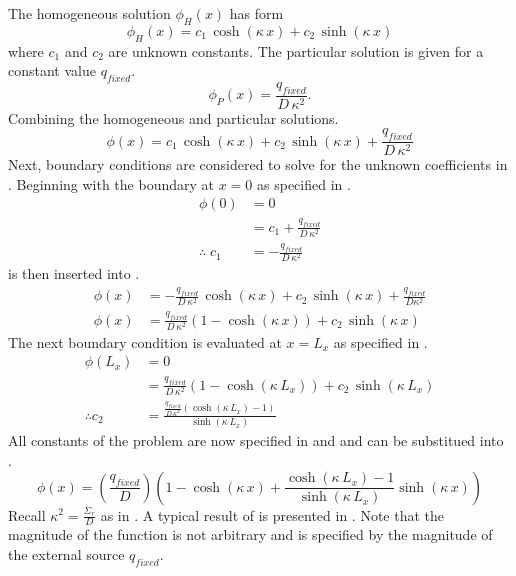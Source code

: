   The homogeneous solution $\phi_H(x)$ has form 
  \begin{equation}
    \label{eq:1dfixed_homog_form}
    \phi_H(x) = c_1 \, \cosh(\kappa \, x) + c_2 \, \sinh(\kappa \, x)
  \end{equation}
  where $c_1$ and $c_2$ are unknown constants.
  The particular solution is given for a constant value $q_{fixed}$.
  \begin{equation}
    \label{eq:1dfixed_particular}
    \phi_P(x) = \frac{q_{fixed}}{D\,\kappa^2}.
  \end{equation}
  Combining the homogeneous and particular solutions.
  \begin{equation}
    \label{eq:1dfixed_constants}
    \phi(x) = c_1 \, \cosh(\kappa \, x) + c_2 \, \sinh(\kappa \, x) +
      \frac{q_{fixed}}{D\,\kappa^2}
  \end{equation}
  Next, boundary conditions are considered to solve for the unknown coefficients
  in . Beginning with the boundary at $x=0$ as 
  specified in .
  \begin{align}
    \phi(0) &= 0 \\
    &= c_1 + \frac{q_{fixed}}{D\,\kappa^2} \\
    \label{eq:1dfixed_c1}
    \therefore \; c_1 &= - \frac{q_{fixed}}{D\,\kappa^2}
  \end{align}
   is then inserted into .
  \begin{align}
    \phi(x) &= -\frac{q_{fixed}}{D\,\kappa^2} \, \cosh(\kappa \, x) + c_2 \,
      \sinh(\kappa \, x) + \frac{q_{fixed}}{D\kappa^2} \\
    \phi(x) &= \frac{q_{fixed}}{D\,\kappa^2} \left( 1- \cosh(\kappa \, x)  
      \right) + c_2 \, \sinh(\kappa \, x)
  \end{align}
  The next boundary condition is evaluated at $x=L_x$ as specified in
  .
  \begin{align}
    \phi(L_x) &= 0 \\
    &= \frac{q_{fixed}}{D\,\kappa^2} \left( 1- \cosh(\kappa \, L_x )  \right) + 
      c_2 \, \sinh(\kappa \, L_x) \\
    \label{eq:1dfixed_c2}
    \therefore c_2 &= \frac{\frac{q_{fixed}}{D\,\kappa^2} 
      \left(\cosh(\kappa \, L_x) - 1 \right)} {\sinh(\kappa \, L_x)}
  \end{align}
  All constants of the problem are now specified in  and 
   and can be substitued into .
  \begin{equation}
    \label{eq:analytic_1dfixedsrc}
    \phi(x) = \left( \frac{q_{fixed}}{D} \right) 
      \left( 1-\cosh(\kappa\,x) +
      \frac{\cosh(\kappa\,L_x)-1}{\sinh(\kappa\,L_x)}
      \sinh(\kappa\,x)\right)
  \end{equation}
  Recall $\kappa^2 = \frac{\Sigma_r}{D}$ as in . A typical 
  result of  is presented in
  . Note that the magnitude of the function is not
  arbitrary and is specified by the magnitude of the external source
  $q_{fixed}$.

